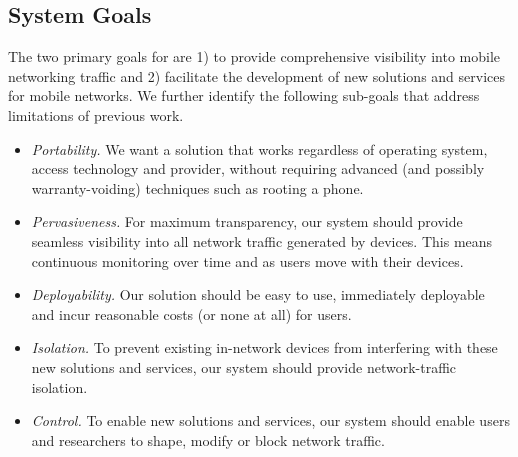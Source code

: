 
\subsection{System Goals}
The two primary goals for \meddle are 1) to provide comprehensive visibility into 
mobile networking traffic and 2) facilitate the development of new solutions 
and services for mobile networks. We further identify the following sub-goals 
that address limitations of previous work.

\begin{itemize}
\item \emph{Portability.} We want a solution that works regardless of operating system, 
access technology and provider, without requiring advanced (and possibly warranty-voiding) 
techniques such as rooting a phone. 
\item \emph{Pervasiveness.} For maximum transparency, our system should provide seamless 
visibility into all network traffic generated by devices. This means continuous monitoring 
over time and as users move with their devices.
\item \emph{Deployability.} Our solution should be easy to use, immediately deployable 
and incur reasonable costs (or none at all) for users. 
\item \emph{Isolation.} To prevent existing in-network devices from interfering with these new 
solutions and services, our system should provide network-traffic isolation. 
\item \emph{Control.} To enable new solutions and services, our system should enable users and researchers 
to shape, modify or block network traffic. 
\end{itemize}

